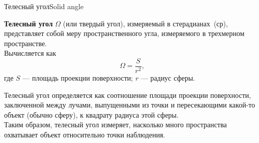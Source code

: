 \documentclass{beamer}
\begin{document}
	\begin{frame}{Телесный угол}{Solid angle}

		\textbf{Телесный угол} $\Omega$ (или твердый угол), измеряемый в стерадианах~(ср), представляет собой меру пространственного угла, измеряемого в трехмерном пространстве. \\
		Вычисляется как
		\[
			\Omega = \frac{S}{r^2}
			,
		\]
		где
		\(S\) --- площадь проекции поверхности;
		\(r\) --- радиус сферы.

		\vspace{0.15cm}

		Телесный угол определяется как соотношение площади проекции поверхности, заключенной между лучами, выпущенными из точки и пересекающими какой-то объект (обычно сферу), к квадрату радиуса этой сферы. \\

		Таким образом, телесный угол измеряет, насколько много пространства охватывает объект относительно точки наблюдения.


	\end{frame}
\end{document}
